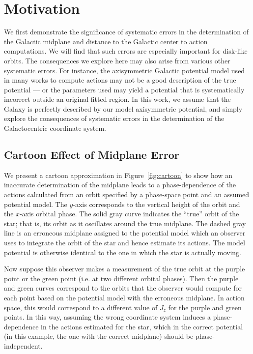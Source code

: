 \documentclass[twocolumn]{aastex62}
\begin{document}
\section{Motivation} \label{sec:ref_frame}
We first demonstrate the significance of systematic errors in the
determination of the Galactic midplane and distance to the Galactic center to
action computations. We will find that such errors are especially important
for disk-like orbits. The consequences we explore here may also arise from
various other systematic errors. For instance, the axisymmetric Galactic
potential model used in many works to compute actions may not be a good
description of the true potential --- or the parameters used may yield a
potential that is systematically incorrect outside an original fitted region.
In this work, we assume that the Galaxy is perfectly described by our model
axisymmetric potential, and simply explore the consequences of systematic
errors in the determination of the Galactocentric coordinate system.

\subsection{Cartoon Effect of Midplane Error} \label{ssec:cartoon}
We present a cartoon approximation in Figure~\ref{fig:cartoon} to show how an
inaccurate determination of the midplane leads to a phase-dependence of the
actions calculated from an orbit specified by a phase-space point and an
assumed potential model. The $y$-axis corresponds to the vertical height of
the orbit and the $x$-axis orbital phase. The solid gray curve indicates the
``true'' orbit of the star; that is, its orbit as it oscillates around the
true midplane. The dashed gray line is an erroneous midplane assigned to the
potential model which an observer uses to integrate the orbit of the star and
hence estimate its actions. The model potential is otherwise identical to the
one in which the star is actually moving.

Now suppose this observer makes a measurement of the true orbit at the purple
point or the green point (i.e. at two different orbital phases). Then the
purple and green curves correspond to the orbits that the observer would
compute for each point based on the potential model with the erroneous
midplane. In action space, this would correspond to a different value of $J_z$
for the purple and green points. In this way, assuming the wrong coordinate
system induces a phase-dependence in the actions estimated for the star, which
in the correct potential (in this example, the one with the correct midplane)
should be phase-independent.
\end{document}
